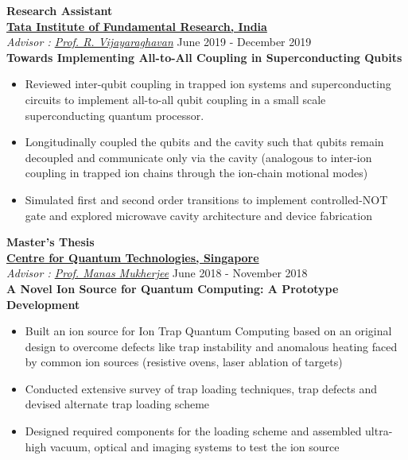 \documentclass[margin, centered, 11pt]{res}
\begin{document}
\begin{resume}
\textbf{Research Assistant}
\\
\textbf{\href{http://www.tifr.res.in/}{Tata Institute of Fundamental Research, India}}\\
\emph{Advisor : \href{http://www.tifr.res.in/~quantro/vijay/index.htm}{Prof. R. Vijayaraghavan} } \hfill June 2019 - December 2019\\
\textbf{Towards Implementing All-to-All Coupling in Superconducting Qubits}
\begin{itemize}[noitemsep, label=\raisebox{0.35ex}{\tiny$\bullet$}]
\item Reviewed inter-qubit coupling in trapped ion systems and superconducting circuits to implement all-to-all qubit coupling in a small scale superconducting quantum processor.
\item Longitudinally coupled the qubits and the cavity such that qubits remain decoupled and communicate only via the cavity (analogous to inter-ion coupling in trapped ion chains through the ion-chain motional modes)
 \item Simulated first and second order transitions to implement controlled-NOT gate and explored microwave cavity architecture and device fabrication
 \end{itemize}

\textbf{Master's Thesis}
\\
\textbf{\href{https://www.quantumlah.org/}{Centre for Quantum Technologies, Singapore}}\\
\emph{Advisor : \href{https://coldiongroup.wixsite.com/index/manas}{Prof. Manas Mukherjee}} \hfill June 2018 - November 2018\\
\textbf{A Novel Ion Source for Quantum Computing: A Prototype Development}
\begin{itemize}[noitemsep, label=\raisebox{0.35ex}{\tiny$\bullet$}]
\item Built an ion source for Ion Trap Quantum Computing based on an original design to overcome defects like trap instability and anomalous heating faced by common ion sources (resistive ovens, laser ablation of targets)
\item Conducted extensive survey of trap loading techniques, trap defects and devised alternate trap loading scheme
\item Designed required components for the loading scheme and assembled ultra-high vacuum, optical and imaging systems to test the ion source
 \end{itemize}


\end{resume}
\end{document}

